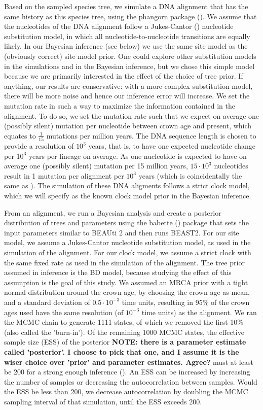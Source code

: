 \documentclass{article}
\begin{document}
Based on the sampled species tree, we simulate a DNA alignment that has the same history
as this species tree, using the phangorn package (\cite{phangorn}). 
We assume that the nucleotides of the DNA alignment follow a Jukes-Cantor (\cite{jc69})
nucleotide substitution model, in which all nucleotide-to-nucleotide transitions
are equally likely. 
In our Bayesian inference (see below) we use the same site model as the (obviously correct) site model prior.
One could explore other substitution models in the simulations 
and in the Bayesian inference, 
but we chose this simple model because we are primarily interested 
in the effect of the choice of tree prior. 
If anything, our results are conservative: with a more complex substitution model, 
there will be more noise and hence our inference error will increase.
We set the mutation rate in such a way to maximize the information contained in the alignment.
To do so, we set the mutation rate such that we expect on average one (possibly silent) mutation per nucleotide
between crown age and present, which equates to $\frac{1}{15}$ mutations
per million years.
The DNA sequence length is chosen to provide a
resolution of $10^3$ years, that is, to have one expected nucleotide change 
per $10^3$ years per lineage on average. As one nucleotide is expected 
to have on average one (possibly silent) mutation per 15 million years, $15 \cdot 10^3$
nucleotides result in 1 mutation per alignment per $10^3$ years (which is
coincidentally the same as \cite{moller2018}). 
The simulation of these DNA aligments follows a strict clock model, 
which we will specify as the known clock model prior in the Bayesian inference.

From an alignment, we run a Bayesian analysis and 
create a posterior distribution of trees and parameters
using the babette (\cite{babette}) package
that sets the input parameters similar to BEAUti 2 and then runs BEAST2. 
For our site model, we assume a Jukes-Cantor 
nucleotide substitution model, as used in the simulation of the alignment.
For our clock model, we assume a strict clock with the same fixed rate as 
used in the simulation of the alignment. 
The tree prior assumed in inference is the BD model, 
because studying the effect of this assumption is the goal of this study. 
We assumed an MRCA prior with a tight normal distribution
around the crown age, by choosing the crown age as mean, and a standard deviation 
of $0.5 \cdot 10^{-3}$ time units,
resulting in 95\% of the crown ages used have the same resolution (of $10^{-3}$ time 
units) as the alignment. 
We ran the MCMC chain to generate 1111 states,
of which we removed the first 10\% (also called the 'burn-in'). 
Of the remaining
1000 MCMC states, the effective sample size (ESS) of the posterior \textbf{NOTE: there
is a parameter estimate called 'posterior'. I choose to pick that one, and I assume
it is the wiser choice over 'prior' and parameter estimates. Agree?} must at least be 200
for a strong enough inference (\cite{beastbook}). An ESS can be increased by increasing
the number of samples or decreasing the autocorrelation between samples. 
Would the ESS be less than 200, we decrease autocorrelation by doubling 
the MCMC sampling interval of that simulation, until the ESS exceeds 200.
\end{document}
